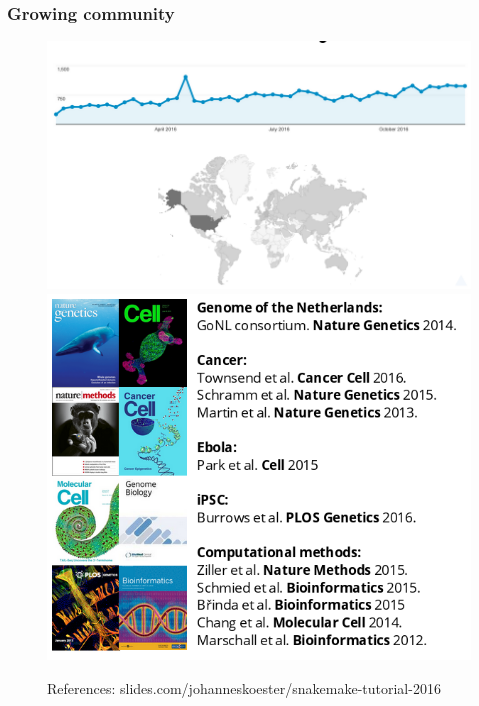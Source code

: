 \documentclass{beamer}
\begin{document}
\begin{frame}
\frametitle{Growing community}
 \begin{figure}
 \includegraphics[scale=0.2]{images/community}
 \pause
 \includegraphics[scale=0.2]{images/citations}
 \caption{References: slides.com/johanneskoester/snakemake-tutorial-2016}
 \end{figure}
\end{frame}
\end{document}
